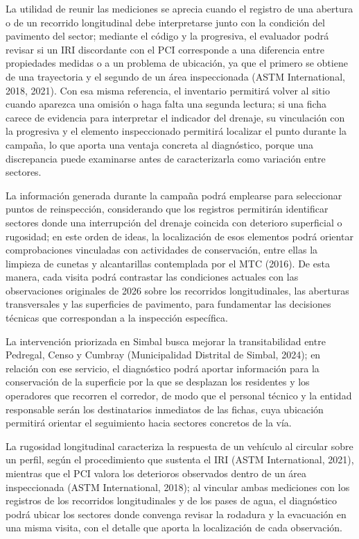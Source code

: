 La utilidad de reunir las mediciones se aprecia cuando el registro de una abertura o de un recorrido longitudinal debe interpretarse junto con la condición del pavimento del sector; mediante el código y la progresiva, el evaluador podrá revisar si un IRI discordante con el PCI corresponde a una diferencia entre propiedades medidas o a un problema de ubicación, ya que el primero se obtiene de una trayectoria y el segundo de un área inspeccionada (ASTM International, 2018, 2021). Con esa misma referencia, el inventario permitirá volver al sitio cuando aparezca una omisión o haga falta una segunda lectura; si una ficha carece de evidencia para interpretar el indicador del drenaje, su vinculación con la progresiva y el elemento inspeccionado permitirá localizar el punto durante la campaña, lo que aporta una ventaja concreta al diagnóstico, porque una discrepancia puede examinarse antes de caracterizarla como variación entre sectores.

La información generada durante la campaña podrá emplearse para seleccionar puntos de reinspección, considerando que los registros permitirán identificar sectores donde una interrupción del drenaje coincida con deterioro superficial o rugosidad; en este orden de ideas, la localización de esos elementos podrá orientar comprobaciones vinculadas con actividades de conservación, entre ellas la limpieza de cunetas y alcantarillas contemplada por el MTC (2016). De esta manera, cada visita podrá contrastar las condiciones actuales con las observaciones originales de 2026 sobre los recorridos longitudinales, las aberturas transversales y las superficies de pavimento, para fundamentar las decisiones técnicas que correspondan a la inspección específica.


La intervención priorizada en Simbal busca mejorar la transitabilidad entre Pedregal, Censo y Cumbray (Municipalidad Distrital de Simbal, 2024); en relación con ese servicio, el diagnóstico podrá aportar información para la conservación de la superficie por la que se desplazan los residentes y los operadores que recorren el corredor, de modo que el personal técnico y la entidad responsable serán los destinatarios inmediatos de las fichas, cuya ubicación permitirá orientar el seguimiento hacia sectores concretos de la vía.

La rugosidad longitudinal caracteriza la respuesta de un vehículo al circular sobre un perfil, según el procedimiento que sustenta el IRI (ASTM International, 2021), mientras que el PCI valora los deterioros observados dentro de un área inspeccionada (ASTM International, 2018); al vincular ambas mediciones con los registros de los recorridos longitudinales y de los pases de agua, el diagnóstico podrá ubicar los sectores donde convenga revisar la rodadura y la evacuación en una misma visita, con el detalle que aporta la localización de cada observación.

